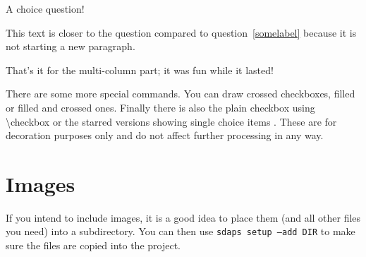 \documentclass[
  english,
  ]{sdapsclassic}
\begin{document}
\begin{questionnaire}
\begin{multicols}{2}
      \begin{choicequestion}[cols=1]{A choice question!}
      \end{choicequestion}

      This text is closer to the question compared to question~\ref{somelabel}
      because it is not starting a new paragraph.


    \end{multicols}

    That's it for the multi-column part; it was fun while it lasted!

    There are some more special commands. You can draw \checkedbox{} crossed
    checkboxes, \filledbox{} filled or \correctedbox{} filled and crossed ones. Finally there is
    also the plain \checkbox{} checkbox using {\ttfamily \textbackslash{}checkbox}
    or the starred versions showing single choice items \checkbox*{}
    \checkedbox*{}. These are for decoration purposes only and do not affect
    further processing in any way.


    \section{Images}

    If you intend to include images, it is a good idea to place them (and all other
    files you need) into a subdirectory. You can then use \texttt{sdaps setup --add DIR}
    to make sure the files are copied into the project.


\end{questionnaire}
\end{document}
